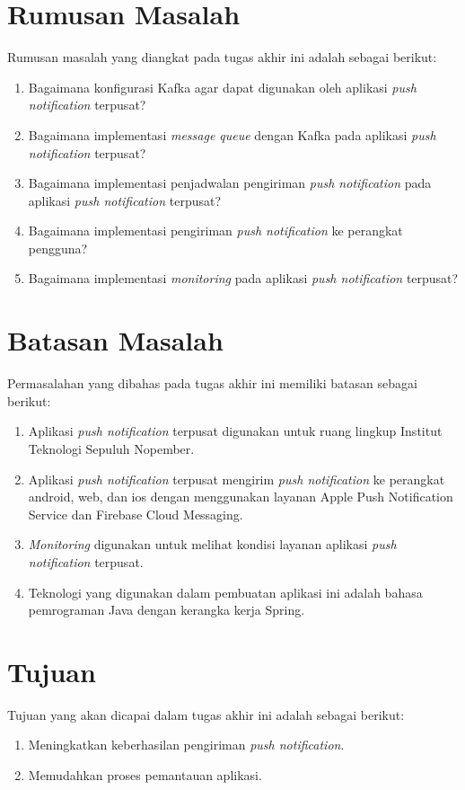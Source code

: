 \section {Rumusan Masalah}
Rumusan masalah yang diangkat pada tugas akhir ini adalah sebagai berikut:
\begin {enumerate}
\item Bagaimana konfigurasi Kafka agar dapat digunakan oleh aplikasi \textit{push notification} terpusat?
\item Bagaimana implementasi \textit{message queue} dengan Kafka pada aplikasi \textit{push notification} terpusat?
\item Bagaimana implementasi penjadwalan pengiriman \textit{push notification} pada aplikasi \textit{push notification} terpusat?
\item Bagaimana implementasi pengiriman \textit{push notification} ke perangkat pengguna?
\item Bagaimana implementasi \textit{monitoring} pada aplikasi \textit{push notification} terpusat?
\end {enumerate}

\section {Batasan Masalah}
Permasalahan yang dibahas pada tugas akhir ini memiliki batasan sebagai berikut:
\begin {enumerate}
\item Aplikasi \textit{push notification} terpusat digunakan untuk ruang lingkup Institut Teknologi Sepuluh Nopember.
\item Aplikasi \textit{push notification} terpusat mengirim \textit{push notification} ke perangkat android, web, dan ios dengan menggunakan layanan Apple Push Notification Service dan Firebase Cloud Messaging.
\item \textit{Monitoring} digunakan untuk melihat kondisi layanan aplikasi \textit{push notification} terpusat.
\item Teknologi yang digunakan dalam pembuatan aplikasi ini adalah bahasa pemrograman Java dengan kerangka kerja Spring.
\end {enumerate}

\section {Tujuan}
Tujuan yang akan dicapai dalam tugas akhir ini adalah sebagai berikut:
\begin{enumerate}
	\item Meningkatkan keberhasilan pengiriman \textit{push notification}.
	\item Memudahkan proses pemantauan aplikasi.
\end{enumerate}

